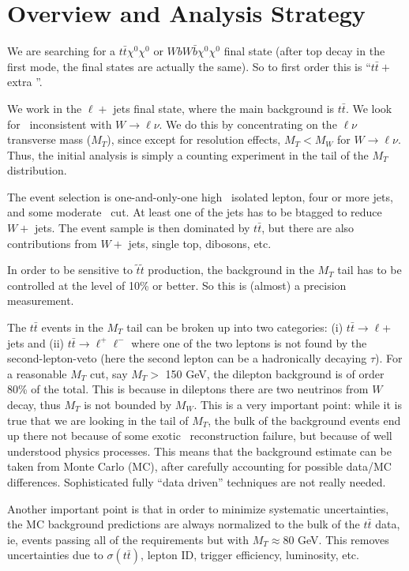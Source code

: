 \section{Overview and Analysis Strategy}
\label{sec:overview}

We are searching for a $t\bar{t}\chi^0\chi^0$ or $W b W \bar{b} \chi^0 \chi^0$ final state
(after top decay in the first mode, the final states are actually the same).  So to first order 
this is ``$t\bar{t} +$ extra \met''.  

We work in the $\ell +$ jets final state, where the main background is $t\bar{t}$.  We look for 
\met\ inconsistent with $W \to \ell \nu$.  We do this by concentrating on the $\ell \nu$ transverse
mass ($M_T$), since except for resolution effects, $M_T < M_W$ for $W \to \ell \nu$.  Thus, the
initial analysis is simply a counting experiment in the tail of the $M_T$ distribution.  

The event selection is one-and-only-one high \pt\ isolated lepton, four or more jets, and
some moderate \met\ cut.  At least one of the jets has to be btagged to reduce $W+$ jets.
The event sample is then dominated by $t\bar{t}$, but there are also contributions from $W+$ jets,
single top, dibosons, etc.

In order to be sensitive to $\widetilde{t}\widetilde{t}$ production, the background in the $M_T$
tail has to be controlled at the level of 10\% or better. So this is (almost) a precision measurement.

The $t\bar{t}$ events in the $M_T$ tail can be broken up into two categories: 
(i) $t\bar{t} \to \ell $+ jets and (ii) $t\bar{t} \to \ell^+ \ell^-$ where one of the two
leptons is not found by the second-lepton-veto (here the second lepton can be a hadronically
decaying $\tau$).
 For a reasonable $M_T$ cut, say $M_T >$ 150 GeV, the dilepton background is of order 80\% of 
the total.  This is because in dileptons there are two neutrinos from $W$ decay, thus $M_T$
is not bounded by $M_W$.  This is a very important point: while it is true that we are looking in
the tail of $M_T$, the bulk of the background events end up there not because of some exotic
\met\ reconstruction failure, but because of well understood physics processes.  This means that 
the background estimate can be taken from Monte Carlo (MC), after carefully accounting for possible
data/MC differences.  Sophisticated fully ``data driven'' techniques are not really needed.

Another important point is that in order to minimize systematic uncertainties, the MC background
predictions are always normalized to the bulk of the $t\bar{t}$ data, ie, events passing all of the 
requirements but with $M_T \approx 80$ GeV.
This removes uncertainties
due to $\sigma(t\bar{t})$, lepton ID, trigger efficiency, luminosity, etc.   

